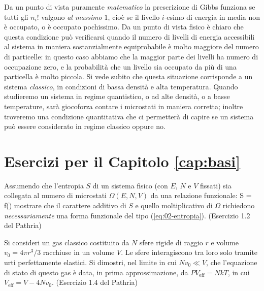 Da un punto di vista puramente {\em matematico} la prescrizione di Gibbs funziona se tutti gli $n_{i}!$ valgono {\em al massimo} $1$, cioè se il livello $i$-esimo di energia in media non è occupato, o è occupato pochissimo. Da un punto di vista fisico è chiaro che questa condizione può verificarsi quando il numero di livelli di energia accessibili al sistema in maniera sostanzialmente equiprobabile è molto maggiore del numero di particelle: in questo caso abbiamo che la maggior parte dei livelli ha numero di occupazione zero, e la probabilità che un livello sia occupato da più di una particella è molto piccola. Si vede subito che questa situazione corrisponde a un sistema {\em classico}, in condizioni di bassa densità e alta temperatura. Quando studieremo un sistema in regime quantistico, o ad alte densità, o a basse temperature, sarà giocoforza contare i microstati in maniera corretta; inoltre troveremo una condizione quantitativa che ci permetterà di capire se un sistema può essere considerato in regime classico oppure no.

\section{Esercizi per il Capitolo \ref{cap:basi}}

\begin{Exercise}[label={ex:02-relaSOmega}, title={Relazione funzionale tra entropia e numero di microstati}]
Assumendo che l'entropia $S$ di un sistema fisico (con $E$, $N$ e $V$ fissati) sia collegata al numero di microstati $\Omega(E,N,V)$ da una relazione funzionale:
\be
S = f(\Omega)
\ee
mostrare che il carattere additivo di $S$ e quello moltiplicativo di $\Omega$ richiedono {\em necessariamente} una forma funzionale del tipo (\ref{eq:02-entropia}). 
(Esercizio 1.2 del Pathria)
\end{Exercise}


\begin{Exercise}[label={ex:02-sfere}, title={Prima correzione all'equazione di stato}]
Si consideri un gas classico costituito da $N$ sfere rigide di raggio $r$ e volume $v_0 = 4\pi r^3/3$ racchiuse in un volume $V$. Le sfere interagiscono tra loro solo tramite urti perfettamente elastici. Si dimostri, nel limite in cui $Nv_0 \ll V$, che l'equazione di stato di questo gas è data, in prima approssimazione, da $PV_{\textrm{eff}} = NkT$, in cui $V_{\textrm{eff}} = V-4Nv_0$.
(Esercizio 1.4 del Pathria)
\end{Exercise}

